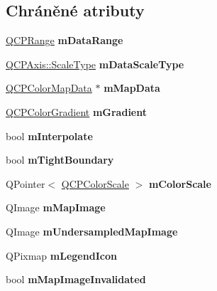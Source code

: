 \subsection*{Chráněné atributy}
\begin{DoxyCompactItemize}
\item 
\hypertarget{classQCPColorMap_ab87609621d16cd3e9d52ad070b327b08}{}\hyperlink{classQCPRange}{Q\+C\+P\+Range} {\bfseries m\+Data\+Range}\label{classQCPColorMap_ab87609621d16cd3e9d52ad070b327b08}

\item 
\hypertarget{classQCPColorMap_ab28a4b2def408f83b9818799d5f18446}{}\hyperlink{classQCPAxis_a36d8e8658dbaa179bf2aeb973db2d6f0}{Q\+C\+P\+Axis\+::\+Scale\+Type} {\bfseries m\+Data\+Scale\+Type}\label{classQCPColorMap_ab28a4b2def408f83b9818799d5f18446}

\item 
\hypertarget{classQCPColorMap_a8709272aa8f0be3ca111bf3866806f8b}{}\hyperlink{classQCPColorMapData}{Q\+C\+P\+Color\+Map\+Data} $\ast$ {\bfseries m\+Map\+Data}\label{classQCPColorMap_a8709272aa8f0be3ca111bf3866806f8b}

\item 
\hypertarget{classQCPColorMap_aab77fe9a8df6f0486ab3507cc5f278fa}{}\hyperlink{classQCPColorGradient}{Q\+C\+P\+Color\+Gradient} {\bfseries m\+Gradient}\label{classQCPColorMap_aab77fe9a8df6f0486ab3507cc5f278fa}

\item 
\hypertarget{classQCPColorMap_af77e5eba9a844592648edeb6fbe834f1}{}bool {\bfseries m\+Interpolate}\label{classQCPColorMap_af77e5eba9a844592648edeb6fbe834f1}

\item 
\hypertarget{classQCPColorMap_ac2e9425fe4381b496726e1c09f978302}{}bool {\bfseries m\+Tight\+Boundary}\label{classQCPColorMap_ac2e9425fe4381b496726e1c09f978302}

\item 
\hypertarget{classQCPColorMap_a95b4100bacc3387652c988b071ec9db7}{}Q\+Pointer$<$ \hyperlink{classQCPColorScale}{Q\+C\+P\+Color\+Scale} $>$ {\bfseries m\+Color\+Scale}\label{classQCPColorMap_a95b4100bacc3387652c988b071ec9db7}

\item 
\hypertarget{classQCPColorMap_a66110813b42eca78b64095b2a1f285a0}{}Q\+Image {\bfseries m\+Map\+Image}\label{classQCPColorMap_a66110813b42eca78b64095b2a1f285a0}

\item 
\hypertarget{classQCPColorMap_acad3d52f3572436d5f2e4057911ea8d3}{}Q\+Image {\bfseries m\+Undersampled\+Map\+Image}\label{classQCPColorMap_acad3d52f3572436d5f2e4057911ea8d3}

\item 
\hypertarget{classQCPColorMap_ada522988db02cb531767d38c5029ef60}{}Q\+Pixmap {\bfseries m\+Legend\+Icon}\label{classQCPColorMap_ada522988db02cb531767d38c5029ef60}

\item 
\hypertarget{classQCPColorMap_ac9aea6a5c193d7fa866bc7b26e79ef2c}{}bool {\bfseries m\+Map\+Image\+Invalidated}\label{classQCPColorMap_ac9aea6a5c193d7fa866bc7b26e79ef2c}

\end{DoxyCompactItemize}
